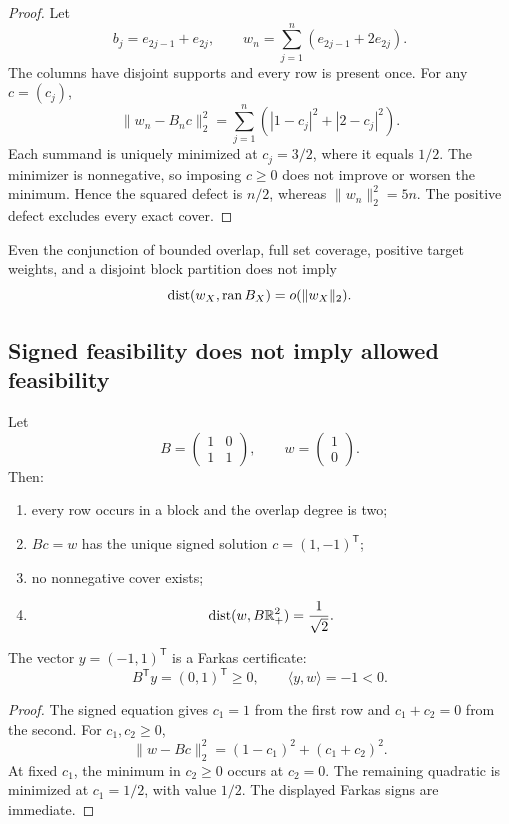 \begin{proof}
Let
\[
 b_j=e_{2j-1}+e_{2j},
 \qquad
 w_n=\sum_{j=1}^n(e_{2j-1}+2e_{2j}).
\]
The columns have disjoint supports and every row is present once.
For any \(c=(c_j)\),
\[
 \|w_n-B_nc\|_2^2
 =
 \sum_{j=1}^n
 \left(|1-c_j|^2+|2-c_j|^2\right).
\]
Each summand is uniquely minimized at \(c_j=3/2\), where it equals
\(1/2\).  The minimizer is nonnegative, so imposing
\(c\ge0\) does not improve or worsen the minimum.  Hence the squared
defect is \(n/2\), whereas
\(\|w_n\|_2^2=5n\).  The positive defect excludes every exact cover.
\end{proof}

\begin{corollary}
\label{cor:no-approx-from-overlap}
Even the conjunction of bounded overlap, full set coverage, positive
target weights, and a disjoint block partition does not imply
\[
 \operatorname{dist}(w_X,\operatorname{ran} B_X)=o(\|w_X\|_2).
\]
\end{corollary}

\subsection{Signed feasibility does not imply allowed feasibility}

\begin{theorem}
\label{thm:cone-counterexample}
Let
\[
 B=
 \begin{pmatrix}
 1&0\\
 1&1
 \end{pmatrix},
 \qquad
 w=
 \begin{pmatrix}
 1\\0
 \end{pmatrix}.
\]
Then:
\begin{enumerate}[label=(\roman*),leftmargin=2.2em]
\item every row occurs in a block and the overlap degree is two;
\item \(Bc=w\) has the unique signed solution \(c=(1,-1)^{\mathsf T}\);
\item no nonnegative cover exists;
\item
  \[
  \operatorname{dist}(w,B\mathbb R_+^2)=\frac1{\sqrt2}.
  \]
\end{enumerate}
The vector \(y=(-1,1)^{\mathsf T}\) is a Farkas certificate:
\[
 B^{\mathsf T}y=(0,1)^{\mathsf T}\ge0,
 \qquad
 \langle y,w\rangle=-1<0.
\]
\end{theorem}

\begin{proof}
The signed equation gives \(c_1=1\) from the first row and
\(c_1+c_2=0\) from the second.  For \(c_1,c_2\ge0\),
\[
 \|w-Bc\|_2^2
 =
 (1-c_1)^2+(c_1+c_2)^2.
\]
At fixed \(c_1\), the minimum in \(c_2\ge0\) occurs at \(c_2=0\).
The remaining quadratic is minimized at \(c_1=1/2\), with value
\(1/2\).  The displayed Farkas signs are immediate.
\end{proof}

